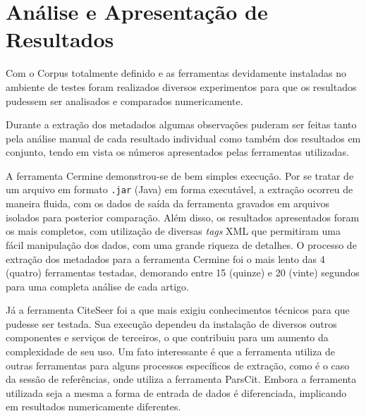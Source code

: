 
\chapter{Análise e Apresentação de Resultados}
\label{cha:results}



Com o Corpus totalmente definido e as ferramentas devidamente instaladas no ambiente de testes foram realizados diversos experimentos para que os resultados pudessem ser analisados e comparados numericamente.


Durante a extração dos metadados algumas observações puderam ser feitas tanto pela análise manual de cada resultado individual como também dos resultados em conjunto, tendo em vista os números apresentados pelas ferramentas utilizadas.

A ferramenta Cermine demonstrou-se de bem simples execução. Por se tratar de um arquivo em formato \texttt{.jar} (Java) em forma executável, a extração ocorreu de maneira fluida, com os dados de saída da ferramenta gravados em arquivos isolados para posterior comparação. Além disso, os resultados apresentados foram os mais completos, com utilização de diversas \emph{tags} XML que permitiram uma fácil manipulação dos dados, com uma grande riqueza de detalhes. O processo de extração dos metadados para a ferramenta Cermine foi o mais lento das 4 (quatro) ferramentas testadas, demorando entre 15 (quinze) e 20 (vinte) segundos para uma completa análise de cada artigo.

Já a ferramenta CiteSeer foi a que mais exigiu conhecimentos técnicos para que pudesse ser testada. Sua execução dependeu da instalação de diversos outros componentes e serviços de terceiros, o que contribuiu para um aumento da complexidade de seu uso. Um fato interessante é que a ferramenta utiliza de outras ferramentas para alguns processos específicos de extração, como é o caso da sessão de referências, onde utiliza a ferramenta ParsCit. Embora a ferramenta utilizada seja a mesma a forma de entrada de dados é diferenciada, implicando em resultados numericamente diferentes.

